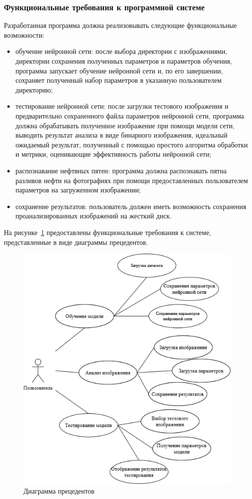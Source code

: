 \subsubsection{Функциональные требования к программной системе}

Разработанная программа должна реализовывать следующие функциональные возможности:

\begin{itemize}
	\item обучение нейронной сети: после выбора директории с изображениями, директории сохранения полученных параметров и параметров обучения, программа запускает обучение нейронной сети и, по его завершении, сохраняет полученный набор параметров в указанную пользователем директорию;
	\item тестирование нейронной сети: после загрузки тестового изображения и предварительно сохраненного файла параметров нейронной сети, программа должна обрабатывать полученное изображение при помощи модели сети, выводить результат анализа в виде бинарного изображения, идеальный ожидаемый результат, полученный с помощью простого алгоритма обработки и метрики, оценивающие эффективность работы нейронной сети;
	\item распознавание нефтяных пятен: программа должна распознавать пятна разливов нефти на фотографиях при помощи предоставленных пользователем параметров на загруженном изображении;
	\item сохранение результатов: пользователь должен иметь возможность сохранения проанализированных изображений на жесткий диск.	
\end{itemize}

На рисунке~\ref{fig:usecase} предоставлены функциональные требования к системе, представленные в виде диаграммы прецедентов\cite{fowler_uml}.

\begin{figure}[H]
	\centering
	\includegraphics[width=0.7\linewidth]{"images/сценарии использования"}
	\caption{Диаграмма прецедентов}
	\label{fig:usecase}
\end{figure}

